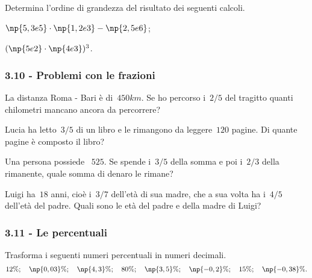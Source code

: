 \begin{esercizio}
 \label{ese:3.74}
Determina l'ordine di grandezza del risultato dei seguenti calcoli.
\begin{multicols}{2}
\begin{enumeratea}
\item $\np{5,3e5}\cdot\np{1,2e3}-\np{2,5e6}$;
\item $(\np{5e2}\cdot\np{4e3})^3$.
\end{enumeratea}
\end{multicols}
\end{esercizio}

\subsubsection*{3.10 - Problemi con le frazioni}

\begin{esercizio}
 \label{ese:3.75}
La distanza Roma - Bari è di~$450\unit{km}$. Se ho percorso i~$2/5$ del tragitto quanti chilometri
mancano ancora da percorrere?
\end{esercizio}

\begin{esercizio}[\Ast]
 \label{ese:3.76}
Lucia ha letto~$3/5$ di un libro e le rimangono da leggere~$120$ pagine. Di quante pagine è composto il libro?
\end{esercizio}

\begin{esercizio}
 \label{ese:3.77}
Una persona possiede \officialeuro~$525$. Se spende i~$3/5$ della somma e poi i~$2/3$ della rimanente,
quale somma di denaro le rimane?
\end{esercizio}

\begin{esercizio}
 \label{ese:3.78}
Luigi ha~$18$ anni, cioè i~$3/7$ dell'età di sua madre, che a sua volta ha i~$4/5$ dell'età
del padre. Quali sono le età del padre e della madre di Luigi?
\end{esercizio}

\subsubsection*{3.11 - Le percentuali}

\begin{esercizio}
 \label{ese:3.79}
Trasforma i seguenti numeri percentuali in numeri decimali.
\[12\%;\quad \np{0,03}\%;\quad \np{4,3}\%;\quad 80\%;\quad \np{3,5}\%;\quad\np{-0,2}\%;\quad 15\%;\quad\np{-0,38}\%.\]
\end{esercizio}


